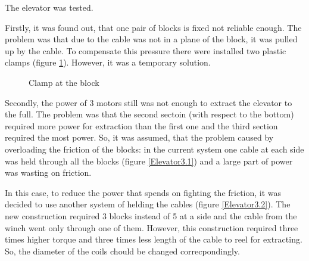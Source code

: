 The elevator was tested. 

Firstly, it was found out, that one pair of blocks is fixed not reliable enough. The problem was that due to the cable was not in a plane of the block, it was pulled up by the cable. To compensate this pressure there were installed two plastic clamps (figure \ref{Elevator2.6}). However, it was a temporary solution.

\begin{figure}[H]
	\begin{minipage}[h]{1\linewidth}
		\caption{Clamp at the block}
		\label{Elevator2.6}
	\end{minipage}
\end{figure}

Secondly, the power of 3 motors still was not enough to extract the elevator to the full. The problem was that the second sectoin (with respect to the bottom) required more power for extraction than the first one and the third section required the most power. So, it was assumed, that the problem caused by overloading the friction of the blocks: in the current system one cable at each side was held through all the blocks (figure \ref{Elevator3.1}) and a large part of power was wasting on friction. 

In this case, to reduce the power that spends on fighting the friction, it was decided to use another system of helding the cables (figure \ref{Elevator3.2}). The new construction required 3 blocks instead of 5 at a side and the cable from the winch went only through one of them. However, this construction required three times higher torque and three times less length of the cable to reel for extracting. So, the diameter of the coils chould be changed correcpondingly.

